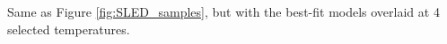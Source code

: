 \label{fig:SLED_exampletems}
Same as Figure \ref{fig:SLED_samples}, but with the best-fit models overlaid at
4 selected temperatures.  
